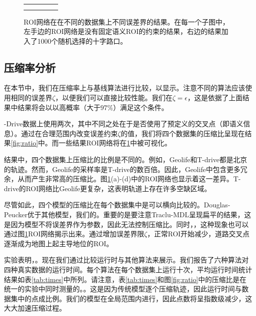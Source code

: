 \begin{figure}[!htb]
\begin{tabular}{ccccc}
{\begin{minipage}[b]{138mm}
\begin{minipage}[b]{101mm}
(g) $\epsilon = 10$ (km)  ~~~~(h) $\epsilon = 30$ (km) ~~~~ (i) $\epsilon = 50$ (km) \\
\end{minipage}
\end{minipage}
}\\
\end{tabular}
\caption{ROI网络在在不同的数据集上不同误差界的结果。在每一个子图中，左手边的ROI网络是没有固定语义ROI的约束的结果，右边的结果加入了1000个随机选择的十字路口。}
\label{fig:illustration}
\end{figure}


\subsection{压缩率分析}
在本节中，我们在压缩率上与基线算法进行比较，以显示。注意不同的算法应该使用相同的误差界$\zeta $，以便我们可以直接比较性能。我们在$\zeta = \epsilon $，这是依据了上面结果中结果将会以以高概率（大于$97\%$）满足这个条件。

-Drive数据上使用两次，其中不同之处在于是否使用了预定义的交叉点（即语义信息）。通过在合理范围内改变误差约束$ \zeta $的值，我们将四个数据集的压缩比呈现在结果\ref{fig:ratio}中。而一些结果ROI网络将在\ref{fig:illustration}中被可视化。

结果中，四个数据集上压缩比的比例是不同的。例如，Geolife和T-drive都是北京的轨迹。然而，Geolife的采样率是T-drive的数百倍。因此，Geolife中包含更多冗余，从而产生非常高的压缩比。图\ref{fig:illustration}(a)-(d)中的ROI网络也显示着这一差异。T-drive的ROI网络比Geolife更复杂，这表明轨道上存在许多空缺区域。

尽管如此，四个模型的压缩比在每个数据集中是可以横向比较的。Douglas-Peucker优于其他模型，我们的。重要的是要注意Traclu-MDL呈现扁平的结果，这是因为模型不将误差界作为参数，因此无法控制压缩比。同时，，这种现象也可以通过图\ref{fig:illustration}ROI网络揭示出来。通过增加误差界限$\zeta$，正常ROI开始减少，道路交叉点逐渐成为地图上起主导地位的ROI。

实验表明，。现在我们通过比较运行时与其他算法来展示。我们报告了六种算法对四种真实数据的运行时间。每个算法在每个数据集上运行十次，平均运行时间统计结果如表\ref{tab:times}中所列。请注意，表\ref{tab:times}和图\ref{fig:ratio}中的压缩比是在统一的实验中同时测量的。。这是因为传统模型逐个压缩轨迹，因此运行时间与数据集中的点成比例。我们的模型在全局范围内进行，因此点数将呈指数级减少，这大大加速压缩过程。




